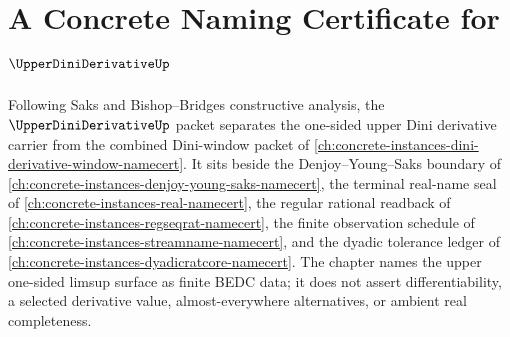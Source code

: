 \chapter{A Concrete Naming Certificate for $\UpperDiniDerivativeUp$}
\label{ch:concrete-instances-upper-dini-derivative-namecert}

Following Saks and Bishop--Bridges constructive analysis, the $\UpperDiniDerivativeUp$ packet separates the one-sided upper Dini derivative carrier from the combined Dini-window packet of \autoref{ch:concrete-instances-dini-derivative-window-namecert}. It sits beside the Denjoy--Young--Saks boundary of \autoref{ch:concrete-instances-denjoy-young-saks-namecert}, the terminal real-name seal of \autoref{ch:concrete-instances-real-namecert}, the regular rational readback of \autoref{ch:concrete-instances-regseqrat-namecert}, the finite observation schedule of \autoref{ch:concrete-instances-streamname-namecert}, and the dyadic tolerance ledger of \autoref{ch:concrete-instances-dyadicratcore-namecert}. The chapter names the upper one-sided limsup surface as finite BEDC data; it does not assert differentiability, a selected derivative value, almost-everywhere alternatives, or ambient real completeness.

